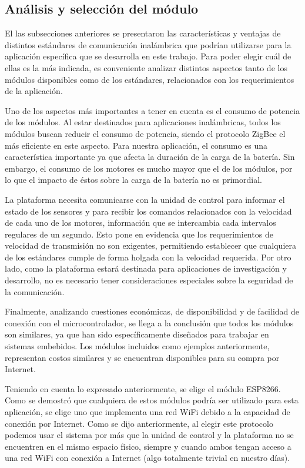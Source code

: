 \documentclass[conference,a4paper,9pt]{IEEEtran}
\begin{document}
\subsection{Análisis y selección del módulo}

El las subsecciones anteriores se presentaron las características y ventajas de distintos estándares de comunicación inalámbrica que podrían utilizarse para la aplicación específica que se desarrolla en este trabajo. Para poder elegir cuál de ellas es la más indicada, es conveniente analizar distintos aspectos tanto de los módulos disponibles como de los estándares, relacionados con los requerimientos de la aplicación.

Uno de los aspectos más importantes a tener en cuenta es el consumo de potencia de los módulos. Al estar destinados para aplicaciones inalámbricas, todos los módulos buscan reducir el consumo de potencia, siendo el protocolo ZigBee el más eficiente en este aspecto. Para nuestra aplicación, el consumo es una característica importante ya que afecta la duración de la carga de la batería. Sin embargo, el consumo de los motores es mucho mayor que el de los módulos, por lo que el impacto de éstos sobre la carga de la batería no es primordial.

La plataforma necesita comunicarse con la unidad de control para informar el estado de los sensores y para recibir los comandos relacionados con la velocidad de cada uno de los motores, información que se intercambia cada intervalos regulares de un segundo. Esto pone en evidencia que los requerimientos de velocidad de transmisión no son exigentes, permitiendo establecer que cualquiera de los estándares cumple de forma holgada con la velocidad requerida. Por otro lado, como la plataforma estará destinada para aplicaciones de investigación y desarrollo, no es necesario tener consideraciones especiales sobre la seguridad de la comunicación.

Finalmente, analizando cuestiones económicas, de disponibilidad y de facilidad de conexión con el microcontrolador, se llega a la conclusión que todos los módulos son similares, ya que han sido específicamente diseñados para trabajar en sistemas embebidos. Los módulos incluidos como ejemplos anteriormente, representan costos similares y se encuentran disponibles para su compra por Internet.

Teniendo en cuenta lo expresado anteriormente, se elige el módulo ESP8266. Como se demostró que cualquiera de estos módulos podría ser utilizado para esta aplicación, se elige uno que implementa una red WiFi debido a la capacidad de conexión por Internet. Como se dijo anteriormente, al elegir este protocolo podemos usar el sistema por más que la unidad de control y la plataforma no se encuentren en el mismo espacio físico, siempre y cuando ambos tengan acceso a una red WiFi con conexión a Internet (algo totalmente trivial en nuestro días).
\end{document}
